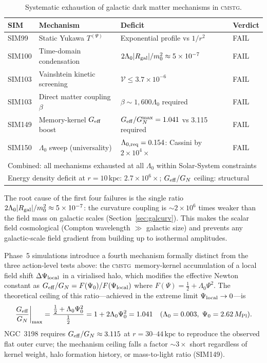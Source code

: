 \documentclass[12pt,a4paper]{article}
\newcommand{\CMSTG}{\textsc{cmstg}}
\newcommand{\Lz}{\Lambda_0}
\newcommand{\Mpl}{M_{\rm Pl}}
\newcommand{\Geff}{G_{\rm eff}}
\theoremstyle{plain}
\begin{document}
\begin{table}[h!]
  \centering
  \caption{Systematic exhaustion of galactic dark matter mechanisms in \CMSTG.}
  \label{tab:combined}
  \begin{tabular}{llll}
    \toprule
    SIM & Mechanism & Deficit & Verdict \\
    \midrule
    SIM99  & Static Yukawa $T^{(\Psi)}$  & Exponential profile vs $1/r^2$ & FAIL \\
    SIM100 & Time-domain condensation     & $2\Lz|R_{\rm gal}|/m_0^2 \approx 5\times10^{-7}$ & FAIL \\
    SIM103 & Vainshtein kinetic screening & $\mathcal{V} \leq 3.7\times10^{-6}$ & FAIL \\
    SIM103 & Direct matter coupling $\beta$ & $\beta \sim 1{,}600\Lz$ required & FAIL \\
    SIM149 & Memory-kernel $\Geff$ boost  & $\Geff/G_N^{\rm max}=1.041$ vs 3.115 required & FAIL \\
    SIM150 & $\Lz$ sweep (universality)  & $\Lambda_{0,{\rm req}}=0.154$: Cassini by $2\times10^4\times$ & FAIL \\
    \midrule
    \multicolumn{4}{l}{Combined: all mechanisms exhausted at all $\Lz$ within Solar-System constraints}\\
    \multicolumn{4}{l}{Energy density deficit at $r=10\,\mathrm{kpc}$: $2.7\times10^6\times$; $\Geff/G_N$ ceiling: structural}\\
    \bottomrule
  \end{tabular}
\end{table}

The root cause of the first four failures is the single ratio
$2\Lz|R_{\rm gal}|/m_0^2 \approx 5\times10^{-7}$: the curvature coupling is
$\sim2\times10^6$ times weaker than the field mass on galactic scales
(Section~\ref{sec:galcurv}). This makes the scalar field cosmological
(Compton wavelength $\gg$ galactic size) and prevents any galactic-scale
field gradient from building up to isothermal amplitudes.

Phase~5 simulations introduce a fourth mechanism formally distinct from the
three action-level tests above: the \CMSTG\ memory-kernel accumulation of a
local field shift $\Delta\Psi_{\rm local}$ in a virialised halo, which modifies
the effective Newton constant as $\Geff/G_N = F(\Psi_0)/F(\Psi_{\rm local})$
where $F(\Psi) = \tfrac{1}{2} + \Lz\Psi^2$. The theoretical ceiling of this
ratio---achieved in the extreme limit $\Psi_{\rm local}\to 0$---is
\begin{equation}
  \frac{\Geff}{G_N}\bigg|_{\rm max} = \frac{\tfrac{1}{2}+\Lz\Psi_0^2}{\tfrac{1}{2}}
    = 1 + 2\Lz\Psi_0^2 = 1.041 \quad (\Lz=0.003,\;\Psi_0=2.62\,\Mpl).
\end{equation}
NGC~3198 requires $\Geff/G_N \approx 3.115$ at $r = 30$--$44\,\mathrm{kpc}$
to reproduce the observed flat outer curve; the mechanism ceiling falls a
factor $\sim3\times$ short regardless of kernel weight, halo formation
history, or mass-to-light ratio (SIM149).
\end{document}
